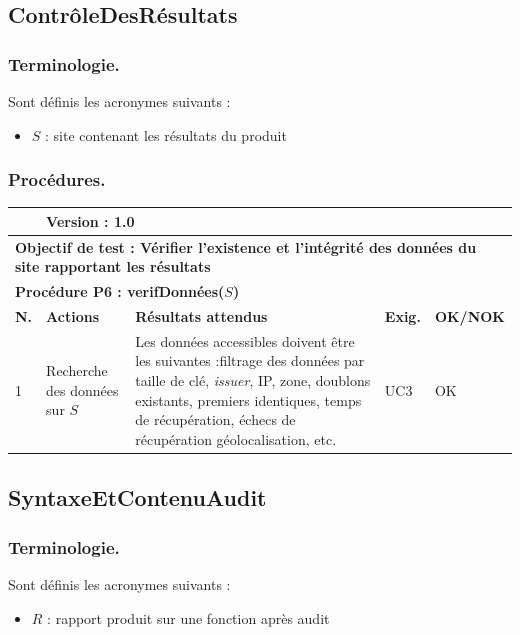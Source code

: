 \documentclass[a4paper,11pt,french]{article}
\begin{document}
\subsection{ContrôleDesRésultats}
\subsubsection*{Terminologie.}
Sont définis les acronymes suivants : 
\begin{itemize}
\item $S$ : site contenant les résultats du produit
\end{itemize}

\subsubsection*{Procédures.}
\noindent
\begin{tabular}{|p{0.5cm}| p{6cm} | p{1cm} | p{4cm} | p{1.5cm}| p{1.5cm}|} 
\hline
\rowcolor{blue}
\multicolumn{2}{|l|}{\color{white}\bfseries{Objet testé : \color{white} \bfseries{ContrôleDesRésultats} }} & 
\multicolumn{4}{l|}{\color{white}\bfseries{Version : \color{white}\bfseries{1.0} }}\\
\hline
\multicolumn{6}{|l|}{\textbf{Objectif de test : Vérifier l'existence et l'intégrité des données du site rapportant les résultats } }\\
\hline
\multicolumn{6}{|l|}{\textbf{Procédure P6 : verifDonnées($S$)} }\\
\hline
\textbf{N.} & \textbf{Actions} & \multicolumn{2}{p{5cm}|}{\textbf{Résultats attendus}} & \textbf{Exig.} & \textbf{OK/NOK} \\
\hline
1 & Recherche des données sur $S$ & \multicolumn{2}{p{6cm}|}{Les données accessibles doivent être les suivantes :\newline [indispensables] filtrage des données par taille de clé, \textit{issuer}, IP, zone, doublons existants, premiers identiques, temps de récupération, échecs de récupération	 \newline [facultatives] géolocalisation, etc. } & UC3 & OK \\

\hline
\end{tabular}


\subsection{SyntaxeEtContenuAudit}
\subsubsection*{Terminologie.}
Sont définis les acronymes suivants : 
\begin{itemize}
\item $R$ : rapport produit sur une fonction après audit
\end{itemize}
\end{document}
